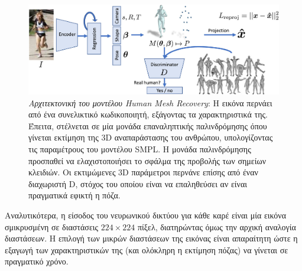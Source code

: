  \begin{figure}[H]
	\centering
	\includegraphics[scale=1.5]{images/chapter3/hmr_architecture.jpg}
	\caption[Αρχιτεκτονική του μοντέλου Human Mesh Recovery]{\textsl{Αρχιτεκτονική του μοντέλου Human Mesh Recovery}: H εικόνα περνάει από ένα συνελικτικό κωδικοποιητή, εξάγοντας τα χαρακτηριστικά της. Έπειτα, στέλνεται σε μία μονάδα επαναληπτικής παλινδρόμησης όπου γίνεται εκτίμηση της 3D αναπαράστασης του ανθρώπου, υπολογίζοντας τις παραμέτρους του μοντέλου SMPL. Η μονάδα παλινδρόμησης προσπαθεί να ελαχιστοποιήσει το σφάλμα της προβολής των σημείων κλειδιών. Οι εκτιμώμενες 3D παράμετροι περνάνε επίσης από έναν διαχωριστή D, στόχος του οποίου είναι να επαληθεύσει αν είναι πραγματικά εφικτή η πόζα.}
	\label{fig:hmr_architecture}
\end{figure}

Αναλυτικότερα, η είσοδος του νευρωνικού δικτύου για κάθε καρέ είναι μία εικόνα σμικρυσμένη σε διαστάσεις $224 \times 224$ πίξελ, διατηρώντας όμως την αρχική αναλογία διαστάσεων. Η επιλογή των μικρών διαστάσεων της εικόνας είναι απαραίτητη ώστε η εξαγωγή των χαρακτηριστικών της (και ολόκληρη η εκτίμηση πόζας) να γίνεται σε πραγματικό χρόνο.

